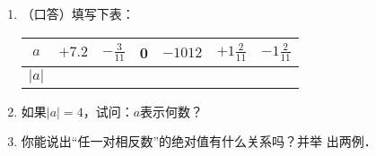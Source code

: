 \begin{ex}
	\begin{enumerate}
		\item （口答）填写下表：
		\begin{center}
			\begin{tabular}{c|cccccc}
				\hline
				$a$ & $+7.2$ & $-\frac{3}{11}$ & 0& $-1012$ &$+1\frac{2}{11}$ &$-1\frac{2}{11}$\\
				\hline
				$|a|$\\
				\hline
			\end{tabular}       
		\end{center}
		\item 如果$|a|=4$，试问：$a$表示何数？
		\item 你能说出“任一对相反数”的绝对值有什么关系吗？并举
		出两例．
	\end{enumerate}
\end{ex}

